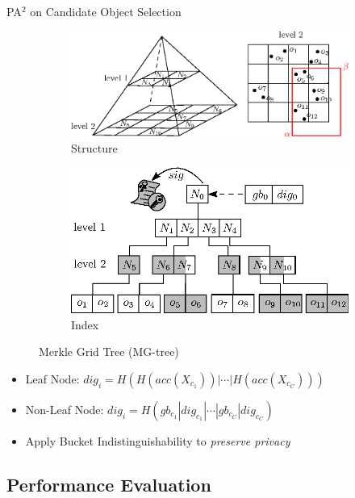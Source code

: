 \documentclass[xcolor={dvipsnames},aspectratio=169,10pt]{beamer}
\begin{document}
\begin{frame}{PA$^2$ on Candidate Object Selection}
  \begin{figure}
    \begin{subfigure}[b]{.4\linewidth}
      \centering
      \includegraphics[width=\linewidth]{figs/aggregate-queries/pyramid.eps}
      \caption{Structure}
    \end{subfigure}\quad%
    \begin{subfigure}[b]{.4\linewidth}
      \centering
      \includegraphics[width=\linewidth]{figs/aggregate-queries/grid_tree.eps}
      \caption{Index}
    \end{subfigure}
    \caption{Merkle Grid Tree (MG-tree)}
  \end{figure}
  \begin{itemize}
    \item \alert{Leaf Node}: $dig_i = H(H(acc(X_{c_1})) | \dotsb | H(acc(X_{c_C})) )$
    \item \alert{Non-Leaf Node}: $dig_i = H(gb_{c_1} | dig_{c_1} | \dotsb | gb_{c_C} | dig_{c_C} )$
    \item Apply \alert{Bucket Indistinguishability} to \emph{preserve privacy}
  \end{itemize}
\end{frame}

\subsection{Performance Evaluation}
\end{document}
